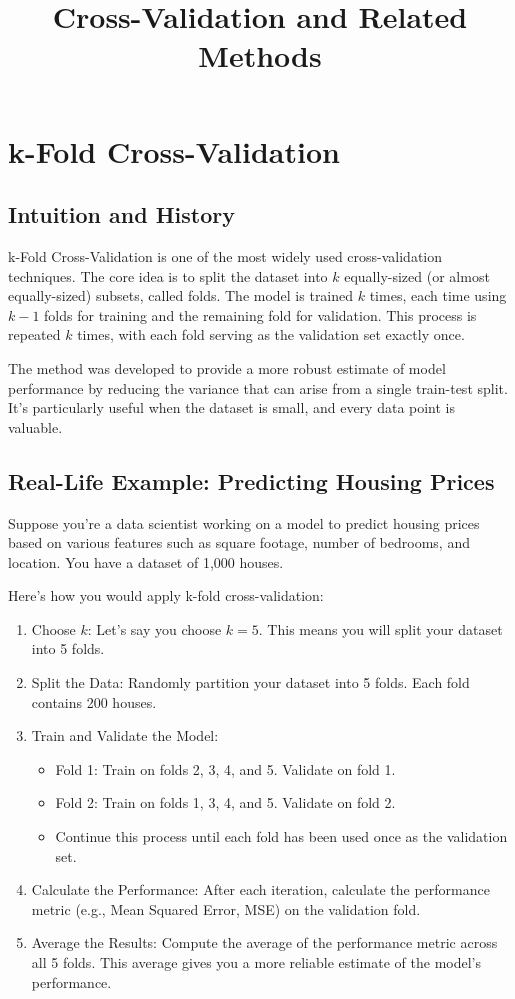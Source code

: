 \documentclass[10pt]{article}
\title{Cross-Validation and Related Methods}
\author{}
\date{}
\begin{document}
\maketitle
\tableofcontents
\section{k-Fold Cross-Validation}
\subsection{Intuition and History}
k-Fold Cross-Validation is one of the most widely used cross-validation techniques. The core idea is to split the dataset into \(k\) equally-sized (or almost equally-sized) subsets, called folds. The model is trained \(k\) times, each time using \(k-1\) folds for training and the remaining fold for validation. This process is repeated \(k\) times, with each fold serving as the validation set exactly once.

The method was developed to provide a more robust estimate of model performance by reducing the variance that can arise from a single train-test split. It’s particularly useful when the dataset is small, and every data point is valuable.

\subsection{Real-Life Example: Predicting Housing Prices}
Suppose you’re a data scientist working on a model to predict housing prices based on various features such as square footage, number of bedrooms, and location. You have a dataset of 1,000 houses.

Here’s how you would apply k-fold cross-validation:

\begin{enumerate}
    \item Choose \(k\): Let's say you choose \(k=5\). This means you will split your dataset into 5 folds.
    \item Split the Data: Randomly partition your dataset into 5 folds. Each fold contains 200 houses.
    \item Train and Validate the Model:
    \begin{itemize}
        \item Fold 1: Train on folds 2, 3, 4, and 5. Validate on fold 1.
        \item Fold 2: Train on folds 1, 3, 4, and 5. Validate on fold 2.
        \item Continue this process until each fold has been used once as the validation set.
    \end{itemize}
    \item Calculate the Performance: After each iteration, calculate the performance metric (e.g., Mean Squared Error, MSE) on the validation fold.
    \item Average the Results: Compute the average of the performance metric across all 5 folds. This average gives you a more reliable estimate of the model’s performance.
\end{enumerate}
\end{document}
